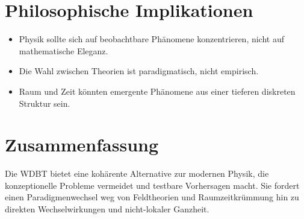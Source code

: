 \documentclass[11pt, a4paper]{article}
\begin{document}
\section*{Philosophische Implikationen}
\begin{itemize}
    \item Physik sollte sich auf beobachtbare Phänomene konzentrieren, nicht auf mathematische Eleganz.
    \item Die Wahl zwischen Theorien ist paradigmatisch, nicht empirisch.
    \item Raum und Zeit könnten emergente Phänomene aus einer tieferen diskreten Struktur sein.
\end{itemize}

\section*{Zusammenfassung}
Die WDBT bietet eine kohärente Alternative zur modernen Physik, die konzeptionelle Probleme vermeidet und testbare Vorhersagen macht. Sie fordert einen Paradigmenwechsel weg von Feldtheorien und Raumzeitkrümmung hin zu direkten Wechselwirkungen und nicht-lokaler Ganzheit.
\end{document}
